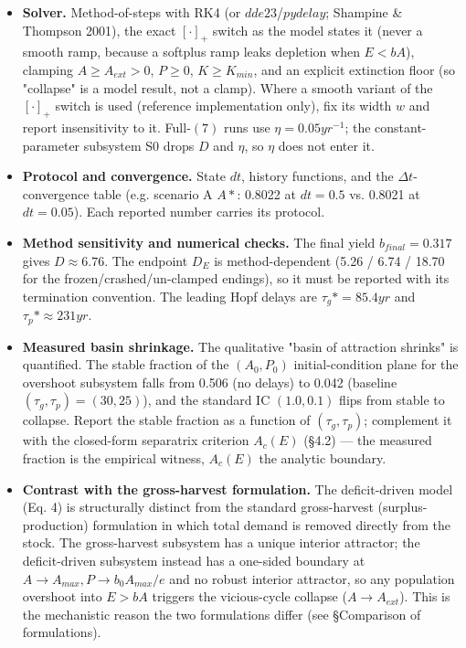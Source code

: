 \documentclass[11pt]{article}
\begin{document}
\begin{itemize}
\item \textbf{Solver.} Method-of-steps with RK4 (or $dde23$/$pydelay$; Shampine \& Thompson 2001), the exact $[\cdot{}]_{+}$ switch as the model states it (never a smooth ramp, because a softplus ramp leaks depletion when $E < bA$), clamping $A \geq{} A_{ext} > 0$, $P \geq{} 0$, $K \geq{} K_{min}$, and an explicit extinction floor (so "collapse" is a model result, not a clamp). Where a smooth variant of the $[\cdot{}]_{+}$ switch is used (reference implementation only), fix its width $w$ and report insensitivity to it. Full-$(7)$ runs use $\eta{} = 0.05 yr^{-1}$; the constant- parameter subsystem S0 drops $D$ and $\eta{}$, so $\eta{}$ does not enter it.
\item \textbf{Protocol and convergence.} State $dt$, history functions, and the $\Delta{}t$-convergence table (e.g. scenario A $A*$: 0.8022 at $dt=0.5$ vs. 0.8021 at $dt=0.05$). Each reported number carries its protocol.
\item \textbf{Method sensitivity and numerical checks.} The final yield $b_{final} = 0.317$ gives $D \approx{} 6.76$. The endpoint $D_{E}$ is method-dependent (5.26 / 6.74 / 18.70 for the frozen/crashed/un-clamped endings), so it must be reported with its termination convention. The leading Hopf delays are $\tau{}_{g}* = 85.4 yr$ and $\tau{}_{p}* \approx{} 231 yr$.
\item \textbf{Measured basin shrinkage.} The qualitative "basin of attraction shrinks" is quantified. The stable fraction of the $(A_{0},P_{0})$ initial-condition plane for the overshoot subsystem falls from 0.506 (no delays) to 0.042 (baseline $(\tau{}_{g},\tau{}_{p})=(30,25)$), and the standard IC $(1.0,0.1)$ flips from stable to collapse. Report the stable fraction as a function of $(\tau{}_{g},\tau{}_{p})$; complement it with the closed-form separatrix criterion $A_{c}(E)$ (§4.2) — the measured fraction is the empirical witness, $A_{c}(E)$ the analytic boundary.
\item \textbf{Contrast with the gross-harvest formulation.} The deficit-driven model (Eq. 4) is structurally distinct from the standard gross-harvest (surplus-production) formulation in which total demand is removed directly from the stock. The gross-harvest subsystem has a unique interior attractor; the deficit-driven subsystem instead has a one-sided boundary at $A \to{} A_{max}, P \to{} b_{0}A_{max}/e$ and no robust interior attractor, so any population overshoot into $E > bA$ triggers the vicious-cycle collapse ($A \to{} A_{ext}$). This is the mechanistic reason the two formulations differ (see §Comparison of formulations).

\end{itemize}
\end{document}
